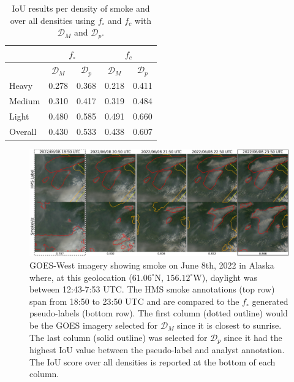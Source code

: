 \documentclass{article}
\begin{document}
\begin{table} 
    \caption{IoU results per density of smoke and over all densities using \(f_{\circ}\) and \(f_c\) with \(\mathcal{D}_M\) and \(\mathcal{D}_p\).}\label{iou_results}
    \centering
    \begin{tabular}{lcc|cc}
        \toprule
        \multicolumn{1}{c}{} & \multicolumn{2}{c}{\(f_{\circ}\)} & \multicolumn{2}{c}{\(f_c\)}\\
        \midrule
        \multicolumn{1}{c}{} & \(\mathcal{D}_M\) & \(\mathcal{D}_{p}\) & \(\mathcal{D}_M\) & \(\mathcal{D}_{p}\) \\
        \midrule
        Heavy   & 0.278 & 0.368 & 0.218 &  0.411 \\
        Medium  & 0.310 & 0.417 & 0.319 &  0.484 \\
        Light   & 0.480 & 0.585 & 0.491 &  0.660 \\
        Overall & 0.430 & 0.533 & 0.438 &  0.607 \\
        \bottomrule
    \end{tabular}
\end{table}

\begin{figure}
    \centering
    \includegraphics[width=\linewidth]{figures/final_results_small.png}
    \caption{GOES-West imagery showing smoke on June 8th, 2022 in Alaska where, at this geolocation (\(61.06^{\circ}\)N, \(156.12^{\circ}\)W), daylight was between 12:43-7:53 UTC. The HMS smoke annotations (top row) span from 18:50 to 23:50 UTC and are compared to the \(f_{\circ}\) generated pseudo-labels (bottom row). The first column (dotted outline) would be the GOES imagery selected for \(\mathcal{D}_{M}\) since it is closest to sunrise. The last column (solid outline) was selected for \(\mathcal{D}_{p}\) since it had the highest IoU value between the pseudo-label and analyst annotation. The IoU score over all densities is reported at the bottom of each column.}
    \label{ml_vs_mei}
\end{figure}
\end{document}
